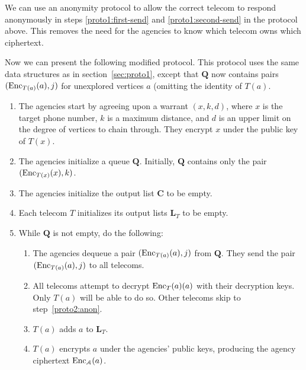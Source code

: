 We can use an anonymity protocol to allow the correct telecom to respond anonymously in steps \ref{proto1:first-send} and \ref{proto1:second-send} in the protocol above. This removes the need for the agencies to know which telecom owns which ciphertext.



Now we can present the following modified protocol. This protocol uses the same data structures as in section~\ref{sec:proto1}, except that $\mathbf{Q}$ now contains pairs $(\operatorname{Enc}_{T(a)}(a), j)$ for unexplored vertices $a$ (omitting the identity of $T(a)$.



\begin{enumerate}

\item The agencies start by agreeing upon a warrant $(x, k, d)$, where $x$ is the target phone number, $k$ is a maximum distance, and $d$ is an upper limit on the degree of vertices to chain through. They encrypt $x$ under the public key of $T(x)$.

\item The agencies initialize a queue $\mathbf{Q}$. Initially, $\mathbf{Q}$ contains only the pair $(\operatorname{Enc}_{T(x)}(x), k)$.

\item The agencies initialize the output list $\mathbf{C}$ to be empty.

\item Each telecom $T$ initializes its output lists $\mathbf{L}_T$ to be empty.

\item While $\mathbf{Q}$ is not empty, do the following:

\begin{enumerate}

\item \label{proto2:dequeue} The agencies dequeue a pair $(\operatorname{Enc}_{T(a)}(a), j)$ from $\mathbf{Q}$. They send the pair $(\operatorname{Enc}_{T(a)}(a), j)$ to all telecoms.

\item All telecoms attempt to decrypt $\operatorname{Enc}_T(a)(a)$ with their decryption keys. Only $T(a)$ will be able to do so. Other telecoms skip to step~\ref{proto2:anon}.

\item $T(a)$ adds $a$ to $\mathbf{L}_T$.

\item \label{proto2:agencycipher} $T(a)$ encrypts $a$ under the agencies' public keys, producing the agency ciphertext $\operatorname{Enc}_\mathcal{A}(a)$.


\end{enumerate}
\end{enumerate}
